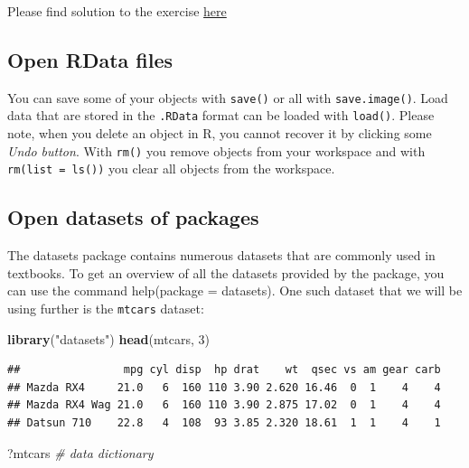 \documentclass[
  12pt,
  oneside]{book}
\newenvironment{Shaded}{\begin{snugshade}}{\end{snugshade}}
\newcommand{\CommentTok}[1]{\textcolor[rgb]{0.56,0.35,0.01}{\textit{#1}}}
\newcommand{\DecValTok}[1]{\textcolor[rgb]{0.00,0.00,0.81}{#1}}
\newcommand{\FunctionTok}[1]{\textcolor[rgb]{0.13,0.29,0.53}{\textbf{#1}}}
\newcommand{\NormalTok}[1]{#1}
\newcommand{\StringTok}[1]{\textcolor[rgb]{0.31,0.60,0.02}{#1}}
\begin{document}
Please find solution to the exercise \href{https://raw.githubusercontent.com/hubchev/courses/main/scr/import_covid_data.R}{here}

\hypertarget{open-rdata-files}{%
\subsection{Open RData files}\label{open-rdata-files}}

You can save some of your objects with \texttt{save()} or all with \texttt{save.image()}. Load data that are stored in the \texttt{.RData} format can be loaded with \texttt{load()}. Please note, when you delete an object in R, you cannot recover it by clicking some \emph{Undo button}.
With \texttt{rm()} you remove objects from your workspace and with \texttt{rm(list\ =\ ls())} you clear all objects from the workspace.

\hypertarget{open-datasets-of-packages}{%
\subsection{Open datasets of packages}\label{open-datasets-of-packages}}

The datasets package contains numerous datasets that are commonly used in textbooks.
To get an overview of all the datasets provided by the package, you can use the command help(package = datasets).
One such dataset that we will be using further is the \texttt{mtcars} dataset:

\begin{Shaded}
\begin{Highlighting}[]
\FunctionTok{library}\NormalTok{(}\StringTok{"datasets"}\NormalTok{)}
\FunctionTok{head}\NormalTok{(mtcars, }\DecValTok{3}\NormalTok{)}
\end{Highlighting}
\end{Shaded}

\begin{verbatim}
##                mpg cyl disp  hp drat    wt  qsec vs am gear carb
## Mazda RX4     21.0   6  160 110 3.90 2.620 16.46  0  1    4    4
## Mazda RX4 Wag 21.0   6  160 110 3.90 2.875 17.02  0  1    4    4
## Datsun 710    22.8   4  108  93 3.85 2.320 18.61  1  1    4    1
\end{verbatim}

\begin{Shaded}
\begin{Highlighting}[]
\NormalTok{?mtcars  }\CommentTok{\# data dictionary}
\end{Highlighting}
\end{Shaded}
\end{document}
